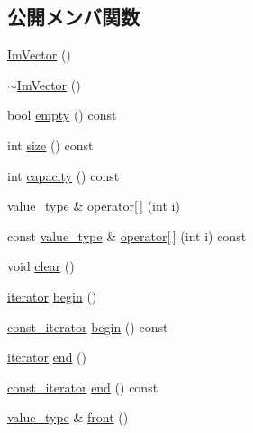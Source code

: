 \subsection*{公開メンバ関数}
\begin{DoxyCompactItemize}
\item 
\mbox{\hyperlink{class_im_vector_a547fff373659fd848c3ecc6b25a83f25}{Im\+Vector}} ()
\item 
\mbox{\hyperlink{class_im_vector_a9b782359ca26eaa1a6a6138fcf341c54}{$\sim$\+Im\+Vector}} ()
\item 
bool \mbox{\hyperlink{class_im_vector_aa53e48a5272f4bad1099368769514ff1}{empty}} () const
\item 
int \mbox{\hyperlink{class_im_vector_a8c903ecb1aaee0601b6a8ad835a4a435}{size}} () const
\item 
int \mbox{\hyperlink{class_im_vector_ac17681baa8b9b5cd97e556da29f9ef73}{capacity}} () const
\item 
\mbox{\hyperlink{class_im_vector_a8bd77e4e7581d8e5f9e98d7c2f3c2a80}{value\+\_\+type}} \& \mbox{\hyperlink{class_im_vector_a59a3eeadda07579727de93ca6844b91e}{operator\mbox{[}$\,$\mbox{]}}} (int i)
\item 
const \mbox{\hyperlink{class_im_vector_a8bd77e4e7581d8e5f9e98d7c2f3c2a80}{value\+\_\+type}} \& \mbox{\hyperlink{class_im_vector_ab97c3f6f1943602e36afb593c6f03ff1}{operator\mbox{[}$\,$\mbox{]}}} (int i) const
\item 
void \mbox{\hyperlink{class_im_vector_ae2d401b4ec5f1113cdb8edb5a61a38f7}{clear}} ()
\item 
\mbox{\hyperlink{class_im_vector_a74b5478f1f6fd471cc71219bce483db6}{iterator}} \mbox{\hyperlink{class_im_vector_a300a8b559cd87a78063046ef81151bce}{begin}} ()
\item 
\mbox{\hyperlink{class_im_vector_aedeac9c5080f9d6ce96ae837768ee4c4}{const\+\_\+iterator}} \mbox{\hyperlink{class_im_vector_ac72cd4105b5c6a7f76157df945b39d4c}{begin}} () const
\item 
\mbox{\hyperlink{class_im_vector_a74b5478f1f6fd471cc71219bce483db6}{iterator}} \mbox{\hyperlink{class_im_vector_a947fbc3b1d8c1997e51ae6caab440379}{end}} ()
\item 
\mbox{\hyperlink{class_im_vector_aedeac9c5080f9d6ce96ae837768ee4c4}{const\+\_\+iterator}} \mbox{\hyperlink{class_im_vector_a06efa87357864d1c130f0f400eeccf8d}{end}} () const
\item 
\mbox{\hyperlink{class_im_vector_a8bd77e4e7581d8e5f9e98d7c2f3c2a80}{value\+\_\+type}} \& \mbox{\hyperlink{class_im_vector_a5b0108d6b1a4a11609723f8305fb9011}{front}} ()

\end{DoxyCompactItemize}
